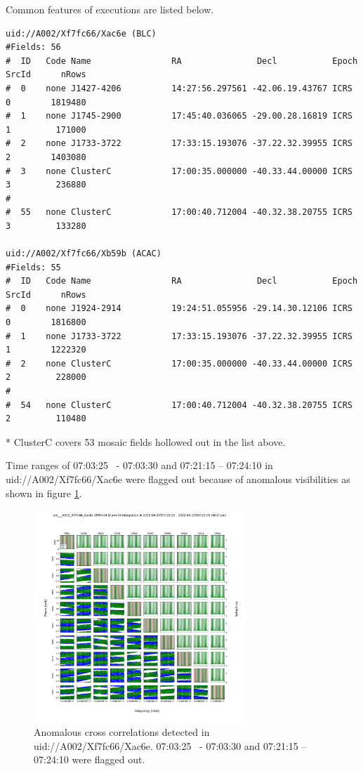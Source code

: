 \documentclass[a4paper, 10pt]{scrartcl}
\begin{document}
Common features of executions are listed below.
\footnotesize
\begin{verbatim}
uid://A002/Xf7fc66/Xac6e (BLC)
#Fields: 56
#  ID   Code Name                RA               Decl           Epoch   SrcId      nRows
#  0    none J1427-4206          14:27:56.297561 -42.06.19.43767 ICRS    0        1819480
#  1    none J1745-2900          17:45:40.036065 -29.00.28.16819 ICRS    1         171000
#  2    none J1733-3722          17:33:15.193076 -37.22.32.39955 ICRS    2        1403080
#  3    none ClusterC            17:00:35.000000 -40.33.44.00000 ICRS    3         236880
#  
#  55   none ClusterC            17:00:40.712004 -40.32.38.20755 ICRS    3         133280

uid://A002/Xf7fc66/Xb59b (ACAC)
#Fields: 55
#  ID   Code Name                RA               Decl           Epoch   SrcId      nRows
#  0    none J1924-2914          19:24:51.055956 -29.14.30.12106 ICRS    0        1816800
#  1    none J1733-3722          17:33:15.193076 -37.22.32.39955 ICRS    1        1222320
#  2    none ClusterC            17:00:35.000000 -40.33.44.00000 ICRS    2         228000
#
#  54   none ClusterC            17:00:40.712004 -40.32.38.20755 ICRS    2         110480
\end{verbatim}
* ClusterC covers 53 mosaic fields hollowed out in the list above.

Time ranges of 07:03:25 ~- 07:03:30 and 07:21:15 -- 07:24:10 in uid://A002/Xf7fc66/Xac6e were flagged out because of anomalous visibilities as shown in figure \ref{fig:flagout}.

\begin{figure}[h]
	\centering
	\includegraphics[width=8cm]{PS_uid___A002_Xf7fc66_Xac6e_Scan26_SPW24.pdf}
	\caption{Anomalous cross correlations detected in uid://A002/Xf7fc66/Xac6e. 07:03:25 ~- 07:03:30 and 07:21:15 -- 07:24:10 were flagged out.}\label{fig:flagout}
\end{figure}
\end{document}
